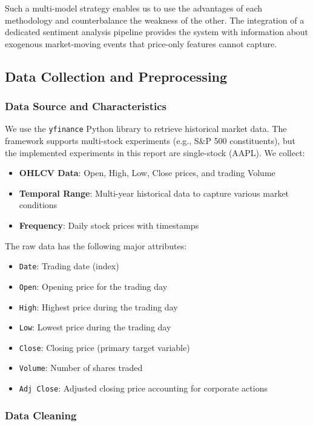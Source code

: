 Such a multi-model strategy enables us to use the advantages of each methodology and counterbalance the weakness of the other. The integration of a dedicated sentiment analysis pipeline provides the system with information about exogenous market-moving events that price-only features cannot capture.

\subsection{Data Collection and Preprocessing}

\subsubsection{Data Source and Characteristics}

We use the \texttt{yfinance} Python library to retrieve historical market data. The framework supports multi-stock experiments (e.g., S\&P 500 constituents), but the implemented experiments in this report are single-stock (AAPL). We collect:

\begin{itemize}
    \item \textbf{OHLCV Data}: Open, High, Low, Close prices, and trading Volume
    \item \textbf{Temporal Range}: Multi-year historical data to capture various market conditions
    \item \textbf{Frequency}: Daily stock prices with timestamps
\end{itemize}

The raw data has the following major attributes:
\begin{itemize}
    \item \texttt{Date}: Trading date (index)
    \item \texttt{Open}: Opening price for the trading day
    \item \texttt{High}: Highest price during the trading day
    \item \texttt{Low}: Lowest price during the trading day
    \item \texttt{Close}: Closing price (primary target variable)
    \item \texttt{Volume}: Number of shares traded
    \item \texttt{Adj Close}: Adjusted closing price accounting for corporate actions
\end{itemize}

\subsubsection{Data Cleaning}

